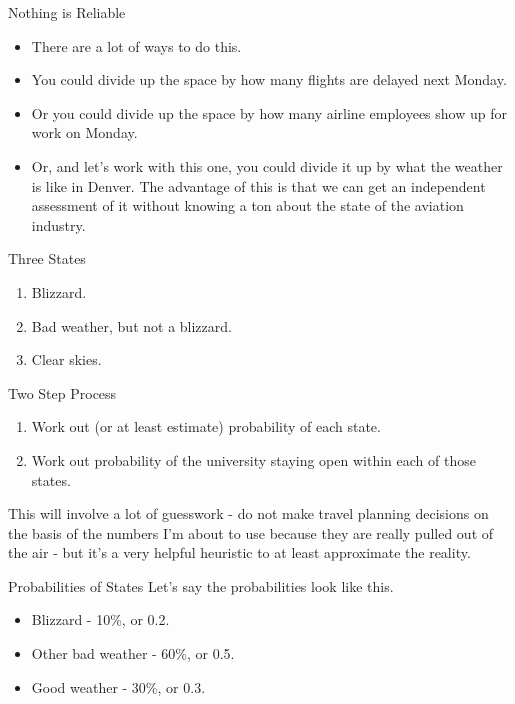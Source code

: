 \documentclass[
  ignorenonframetext,
]{beamer}
\providecommand{\tightlist}{%
  \setlength{\itemsep}{0pt}\setlength{\parskip}{0pt}}
\renewcommand{\,}{\text{, }}
\begin{document}
\begin{frame}{Nothing is Reliable}
\protect\hypertarget{nothing-is-reliable}{}
\begin{itemize}[<+->]
\tightlist
\item
  There are a lot of ways to do this.
\item
  You could divide up the space by how many flights are delayed next
  Monday.
\item
  Or you could divide up the space by how many airline employees show up
  for work on Monday.
\item
  Or, and let's work with this one, you could divide it up by what the
  weather is like in Denver. The advantage of this is that we can get an
  independent assessment of it without knowing a ton about the state of
  the aviation industry.
\end{itemize}
\end{frame}

\begin{frame}{Three States}
\protect\hypertarget{three-states}{}
\begin{enumerate}
\tightlist
\item
  Blizzard.
\item
  Bad weather, but not a blizzard.
\item
  Clear skies.
\end{enumerate}
\end{frame}

\begin{frame}{Two Step Process}
\protect\hypertarget{two-step-process}{}
\begin{enumerate}
\tightlist
\item
  Work out (or at least estimate) probability of each state.
\item
  Work out probability of the university staying open within each of
  those states.
\end{enumerate}

This will involve a lot of guesswork - do not make travel planning
decisions on the basis of the numbers I'm about to use because they are
really pulled out of the air - but it's a very helpful heuristic to at
least approximate the reality.
\end{frame}

\begin{frame}{Probabilities of States}
\protect\hypertarget{probabilities-of-states}{}
Let's say the probabilities look like this.

\begin{itemize}
\tightlist
\item
  Blizzard - 10\%, or 0.2.
\item
  Other bad weather - 60\%, or 0.5.
\item
  Good weather - 30\%, or 0.3.
\end{itemize}
\end{frame}
\end{document}
